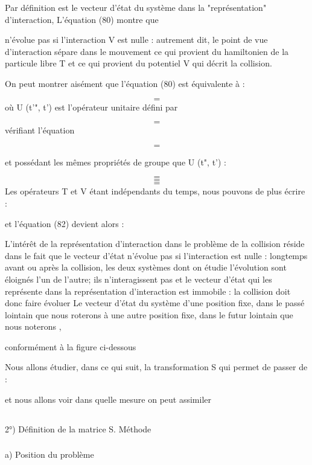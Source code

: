 
Par définition  est le vecteur d'état du système dans
la "représentation" d'interaction, L'équation (80) montre que

 n'évolue pas si l'interaction V est nulle : autrement
dit, le point de vue d'interaction sépare dans le mouvement ce
qui provient du hamiltonien de la particule libre T et ce qui
provient du potentiel V qui décrit la collision.

On peut montrer aisément que l'équation (80) est équivalente à :

\[
\tag{81}=
\]
où U (t'", t') est l'opérateur unitaire défini par

\[
\tag{82}=
\]
vérifiant l'équation

\[
\tag{83}=
\]

et possédant les mêmes propriétés de groupe que U (t", t') :

\[
\tag{84-a}=
\]
\[
\tag{84-b}=
\]
\[
\tag{84-c}=
\]
Les opérateurs T et V étant indépendants du temps, nous pouvons
de plus écrire :

et l'équation (82) devient alors :

% 
L'intérêt de la représentation d'interaction dans le problème de la collision
réside dans le fait que le vecteur d'état n'évolue
pas si l'interaction est nulle : longtemps avant ou après la collision,
les deux systèmes dont on étudie l'évolution sont éloignés l'un de
l'autre; ils n'interagissent pas et le vecteur d'état qui les représente dans
la représentation d'interaction est immobile : la collision
doit donc faire évoluer Le vecteur d'état du système d'une position
fixe, dans le passé lointain que nous roterons  à une
autre position fixe, dans le futur lointain que nous noterons ,

conformément à la figure ci-dessous

Nous allons étudier, dans ce qui suit, la transformation S qui permet de
passer de :

et nous allons voir dans quelle mesure on peut assimiler 


\subsection{}%
2°) Définition de la matrice S. Méthode

\subsubsection{}%
a) Position du problème

